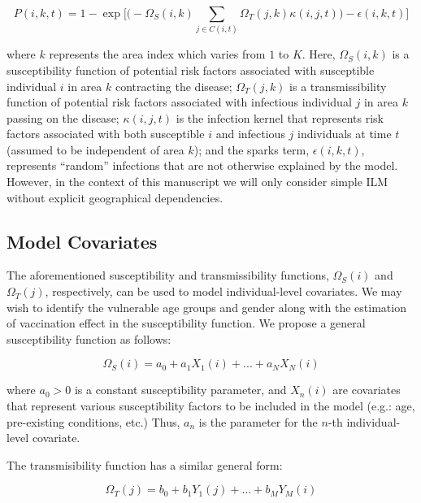 \documentclass{article}
\begin{document}
\begin{equation}
P(i, k, t)=1-\exp\big[ \big( -\Omega_{S}(i, k) \sum\limits_{j \in C(i, t)} \Omega_{T}(j, k) \kappa(i, j, t)\big) - \epsilon(i, k, t)\big]
\end{equation}

where $k$ represents the area index which varies from $1$ to $K$. Here, $\Omega_{S}(i, k)$ is a susceptibility function of potential risk factors associated with susceptible individual $i$ in area $k$ contracting the disease; $\Omega_{T}(j, k)$ is a transmissibility function of potential risk factors associated with infectious individual $j$ in area $k$ passing on the disease; $\kappa(i, j, t)$ is the infection kernel that represents risk factors associated with both susceptible $i$ and infectious $j$ individuals at time $t$ (assumed to be independent of area $k$); and the sparks term, $\epsilon(i, k, t)$, represents “random” infections that are not otherwise explained by the model. However, in the context of this manuscript we will only consider simple ILM without explicit geographical dependencies.

\subsection{Model Covariates}

The aforementioned susceptibility and transmissibility functions, $\Omega_{S}(i)$ and $\Omega_{T}(j)$, respectively, can be used to model individual-level covariates. We may wish to identify the vulnerable age groups and gender along with the estimation of vaccination effect in the susceptibility function. We propose a general susceptibility function as follows:

\begin{equation}
\Omega_{S}(i)=a_{0} + a_{1} X_{1}(i) + ... + a_{N} X_{N}(i)
\end{equation}

where $a_0>0$ is a constant susceptibility parameter, and $X_{n}(i)$ are covariates that represent various susceptibility factors to be included in the model (e.g.: age, pre-existing conditions, etc.) Thus, $a_{n}$ is the parameter for the $n$-th individual-level covariate.

The transmisibility function has a similar general form:

\begin{equation}
\Omega_{T}(j)=b_{0} + b_{1} Y_{1}(j) + ... + b_{M} Y_{M}(i)
\end{equation}
\end{document}
